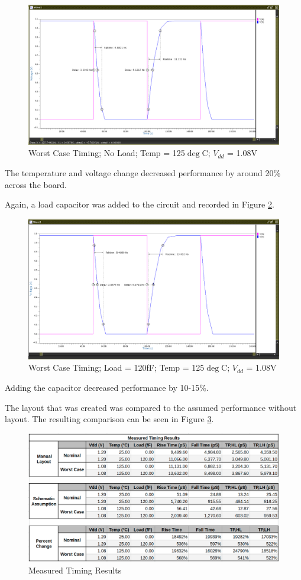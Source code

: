 \documentclass[11pt]{article}
\begin{document}
		\begin{figure}[H]
			\centering
			\includegraphics[width=0.7\linewidth]{"Pictures/Worst Case No Cap"}
			\caption{Worst Case Timing; No Load; Temp = 125$\deg$C; $V_{dd}$ = 1.08V}
			\label{fig:worst-case-no-cap}
		\end{figure}
	
		The temperature and voltage change decreased performance by around 20\% across the board.
		
		
		Again, a load capacitor was added to the circuit and recorded in Figure \ref{fig:worst-case-cap}.
		
		\begin{figure}[H]
			\centering
			\includegraphics[width=0.7\linewidth]{"Pictures/Worst Case Cap"}
			\caption{Worst Case Timing; Load = 120fF; Temp = 125$\deg$C; $V_{dd}$ = 1.08V}
			\label{fig:worst-case-cap}
		\end{figure}

		Adding the capacitor decreased performance by 10-15\%.
		
		The layout that was created was compared to the assumed performance without layout. The resulting comparison can be seen in Figure \ref{fig:measured-timing-results}.

		
		\begin{figure}[H]
			\centering
			\includegraphics[width=0.7\linewidth]{"Pictures/Measured Timing Results"}
			\caption{Measured Timing Results}
			\label{fig:measured-timing-results}
		\end{figure}
	
\end{document}
